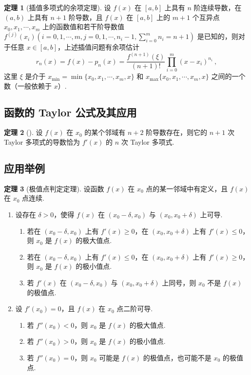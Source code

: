 \documentclass[zihao=-4,linespread=1.8,UTF8,nothm]{aytony_base}
\theoremstyle{definition}
\newtheorem{theorem}{\indent\heiti\textbf{定理}}[subsection]
\begin{document}
\begin{theorem}[插值多项式的余项定理]
    设 $f(x)$ 在 $[a, b]$ 上具有 $n$ 阶连续导数，在 $(a, b)$ 上具有 $n+1$ 阶导数，且 $f(x)$ 在 $[a, b] $ 上的 $m+1$ 个互异点 $x_0, x_1, \cdots, x_m$ 上的函数值和若干阶导数值 $f ^{(j)}(x_i)(i = 0, 1, \cdots, m, j = 0, 1, \cdots, n_i-1, \sum\limits_{i=0}^{m}n_i = n+1)$ 是已知的，则对于任意 $x \in [a, b]$，上述插值问题有余项估计 $$
        r_n(x) = f(x) - p_n(x) = \dfrac{f ^{(n+1)}(\xi)}{(n+1)!}\prod_{i=0}^m(x - x_i)^{n_i}\ ,
    $$ 这里 $\xi$ 是介于 $x_{\mathrm{min}} = \min\{x_0, x_1, \cdots, x_m, x\}$ 和 $x_{\mathrm{max}}\{x_0, x_1, \cdots, x_m, x\}$ 之间的一个数（一般依赖于 $x$）.
\end{theorem}

\subsection{函数的 Taylor 公式及其应用}

\begin{theorem}[]
    设 $f(x)$ 在 $x_0$ 的某个邻域有 $n+2$ 阶导数存在，则它的 $n+1$ 次 Taylor 多项式的导数恰为 $f'(x)$ 的 $n$ 次 Taylor 多项式.
\end{theorem}

\subsection{应用举例}

\begin{theorem}[极值点判定定理]
    设函数 $f(x)$ 在 $x_0$ 点的某一邻域中有定义，且 $f(x)$ 在 $x_0$ 点连续.
    \begin{enumerate}
        \item 设存在 $\delta > 0$，使得 $f(x)$ 在 $(x_0 - \delta, x_0)$ 与 $(x_0, x_0 + \delta)$ 上可导.
              \begin{enumerate}
                  \item 若在 $(x_0 - \delta, x_0)$ 上有 $f'(x) \geqslant 0$，在 $(x_0, x_0 + \delta)$ 上有 $f'(x) \leqslant 0$，则 $x_0$ 是 $f(x)$ 的极大值点.
                  \item 若在 $(x_0 - \delta, x_0)$ 上有 $f'(x) \leqslant  0$，在 $(x_0, x_0 + \delta)$ 上有 $f'(x) \geqslant 0$，则 $x_0$ 是 $f(x)$ 的极小值点.
                  \item 若 $f'(x)$ 在 $(x_0 - \delta, x_0)$ 与 $(x_0, x_0 + \delta)$ 上同号，则 $x_0$ 不是 $f(x)$ 的极值点.
              \end{enumerate}
        \item 设 $f'(x_0) = 0$，且 $f(x)$ 在 $x_0$ 点二阶可导.
              \begin{enumerate}
                  \item 若 $f''(x_0) < 0$，则 $x_0$ 是 $f(x)$ 的极大值点.
                  \item 若 $f''(x_0) > 0$，则 $x_0$ 是 $f(x)$ 的极小值点.
                  \item 若 $f''(x_0) = 0$，则 $x_0$ 可能是 $f(x)$ 的极值点，也可能不是 $x_0$ 的极值点.
              \end{enumerate}
    \end{enumerate}
\end{theorem}
\end{document}

